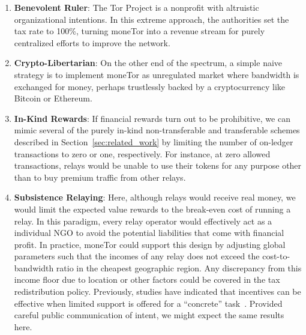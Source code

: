 \begin{enumerate}

\item \textbf{Benevolent Ruler}: The Tor Project is a nonprofit with
altruistic organizational intentions. In this extreme approach, the
authorities set the tax rate to 100\%, turning moneTor into a revenue stream for
purely centralized efforts to improve the network.

\item \textbf{Crypto-Libertarian}: On the other end of the spectrum, a simple
naive strategy is to implement moneTor as unregulated market where bandwidth is
exchanged for money, perhaps trustlessly backed by a cryptocurrency like Bitcoin
or Ethereum.

\item \textbf{In-Kind Rewards}: If financial rewards turn out to be
  prohibitive, we can mimic several of the purely in-kind non-transferable and
  transferable schemes described in Section~\ref{sec:related_work} by limiting
  the number of on-ledger transactions to zero or one, respectively. For
  instance, at zero allowed transactions, relays would be unable to use their
  tokens for any purpose other than to buy premium traffic from other relays.

\item \textbf{Subsistence Relaying}: Here, although relays would receive real money,
  we would limit the expected value rewards to the break-even cost of running a
  relay. In this paradigm, every relay operator would effectively act as a
  individual NGO to avoid the potential liabilities that come with financial
  profit. In practice, moneTor could support this design by adjusting global
  parameters such that the incomes of any relay does not exceed the
  cost-to-bandwidth ratio in the cheapest geographic region. Any discrepancy
  from this income floor due to location or other factors could be covered in
  the tax redistribution policy. Previously, studies have indicated that
  incentives can be effective when limited support is offered for a ``concrete''
  task~\cite{10.1257/jep.25.4.191, 10.1086/431263}. Provided careful public
  communication of intent, we might expect the same results here.


\end{enumerate}
